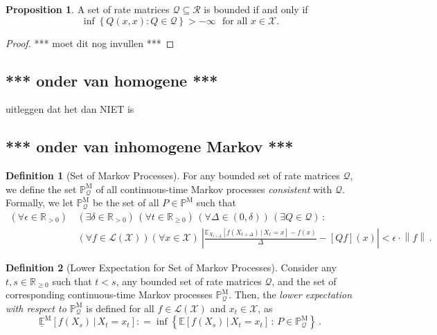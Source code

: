 \documentclass[10pt]{paper}
\theoremstyle{definition}
\newtheorem{proposition}[theorem]{Proposition}
\newtheorem{definition}{Definition}
\newcommand{\reals}{\mathbb{R}}
\newcommand{\realspos}{\reals_{>0}}
\newcommand{\realsnonneg}{\reals_{\geq 0}}
\newcommand{\states}{\mathcal{X}}
\newcommand{\processes}{\mathbb{P}}
\newcommand{\mprocesses}{\processes^{\mathrm{M}}}
\newcommand{\gambles}{\mathcal{L}}
\newcommand{\gamblesX}{\gambles(\states)}
\newcommand{\rateset}{\mathcal{Q}}
\newcommand{\norm}[1]{\left\lVert #1 \right\rVert}
\newcommand{\coloneqq}{:\!=}
\begin{document}
\begin{proposition}\label{prop:alternativedefforbounded}
A set of rate matrices $\rateset\subseteq\mathcal{R}$ is bounded if and only if
\begin{equation*}
\inf\left\{Q(x,x)\colon Q\in\rateset\right\}>-\infty\text{~~for all $x\in\states$.}
\end{equation*}
\end{proposition}
\begin{proof}
*** moet dit nog invullen ***
\end{proof}

\subsection{*** onder van homogene ***}

uitleggen dat het dan NIET is

\subsection{*** onder van inhomogene Markov ***}


\begin{definition}[Set of Markov Processes]\label{def:markov_process_set_new}
For any bounded set of rate matrices $\rateset$, we define the set $\mprocesses_{\rateset}$ of all continuous-time Markov processes \emph{consistent} with $\rateset$. Formally, we let $\mprocesses_{\rateset}$ be the set of all $P\in\mprocesses$ such that
\begin{align*}\label{eq:conditionforMarkov_new}
(\forall\epsilon\in\realspos)&\,
(\exists\delta\in\realspos)\,
(\forall t\in\realsnonneg)\,
(\forall\Delta\in(0,\delta))\,
(\exists Q\in\rateset)\,:\\
 &\,(\forall f\in\gamblesX)(\forall x\in\states)~
\left\lvert\frac{\mathbb{E}_{X_{t+\Delta}}[f(X_{t+\Delta})\,\vert\,X_t=x]-f(x)}{\Delta}-\left[Qf\right](x)\right\rvert<\epsilon\cdot\norm{f}\,.
\end{align*}
\end{definition}

\begin{definition}[Lower Expectation for Set of Markov Processes]\label{def:lower_markov} Consider any $t,s\in\realsnonneg$ such that $t<s$, any bounded set of rate matrices $\rateset$, and the set of corresponding continuous-time Markov processes $\mprocesses_\rateset$. Then, the \emph{lower expectation with respect to $\mprocesses_\rateset$} is defined for all $f\in\gamblesX$ and $x_t\in\states$, as
\begin{equation*}
\underline{\mathbb{E}}^\mathrm{M}[f(X_s)\,\vert\,X_t=x_t] \coloneqq \inf\left\{\mathbb{E}[f(X_s)\,\vert\,X_t=x_t]\,:\,P\in\mprocesses_\rateset\right\}\,.
\end{equation*}
\end{definition}
\end{document}
